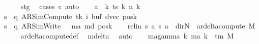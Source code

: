 \begin{isabellebody}
\ \ \ \ \isamarkupfalse%
\ stg\ \isamarkupfalse%
\ {\isacharparenleft}{\kern0pt}cases\ c{\isacharprime}{\kern0pt}{\isacharparenright}{\kern0pt}\ auto\isanewline
\ \ \isamarkupfalse%
\ {\isacharquery}{\kern0pt}a\ {\isacharequal}{\kern0pt}\ {\isachardoublequoteopen}{\isasymlambda}k{\isachardot}{\kern0pt}\ ts\ k\ {\isacharparenleft}{\kern0pt}n\ k{\isacharparenright}{\kern0pt}{\isachardoublequoteclose}\isanewline
\ \ \isamarkupfalse%
\ {\isacharquery}{\kern0pt}s\ {\isacharequal}{\kern0pt}\ {\isachardoublequoteopen}{\isacharparenleft}{\kern0pt}q{\isacharcomma}{\kern0pt}\ AR{\isacharunderscore}{\kern0pt}SimCompute{\isacharcomma}{\kern0pt}\ tk{\isacharcomma}{\kern0pt}\ i{\isacharcomma}{\kern0pt}\ buf{\isacharcomma}{\kern0pt}\ dvec{\isacharcomma}{\kern0pt}\ posk{\isacharparenright}{\kern0pt}{\isachardoublequoteclose}\isanewline
\ \ \isamarkupfalse%
\ {\isacharquery}{\kern0pt}s{\isacharprime}{\kern0pt}\ {\isacharequal}{\kern0pt}\ {\isachardoublequoteopen}{\isacharparenleft}{\kern0pt}q{\isacharprime}{\kern0pt}{\isacharcomma}{\kern0pt}\ AR{\isacharunderscore}{\kern0pt}SimWrite{\isacharcomma}{\kern0pt}\ {}{\isacharcomma}{\kern0pt}\ {}{\isacharcomma}{\kern0pt}\ m{\isacharunderscore}{\kern0pt}a{\isacharprime}{\kern0pt}{\isacharcomma}{\kern0pt}\ m{\isacharunderscore}{\kern0pt}d{\isacharcomma}{\kern0pt}\ posk{\isacharparenright}{\kern0pt}{\isachardoublequoteclose}\isanewline
\ \ \isamarkupfalse%
\ rel{\isacharunderscore}{\kern0pt}in{\isacharcolon}{\kern0pt}\ {\isachardoublequoteopen}{\isacharparenleft}{\kern0pt}{\isacharquery}{\kern0pt}s{\isacharcomma}{\kern0pt}\ {\isacharquery}{\kern0pt}a{\isacharcomma}{\kern0pt}\ {\isacharquery}{\kern0pt}s{\isacharprime}{\kern0pt}{\isacharcomma}{\kern0pt}\ {\isacharquery}{\kern0pt}a{\isacharcomma}{\kern0pt}\ {\isacharparenleft}{\kern0pt}{\isasymlambda}{\isacharunderscore}{\kern0pt}{\isachardot}{\kern0pt}\ dir{\isachardot}{\kern0pt}N{\isacharparenright}{\kern0pt}{\isacharparenright}{\kern0pt}\ {\isasymin}\ ar{\isacharunderscore}{\kern0pt}delta{\isacharunderscore}{\kern0pt}compute\ M{\isachardoublequoteclose}\isanewline
\ \ \ \ \isamarkupfalse%
\ ar{\isacharunderscore}{\kern0pt}delta{\isacharunderscore}{\kern0pt}compute{\isacharunderscore}{\kern0pt}def\ \isamarkupfalse%
\ mdelta\ \isamarkupfalse%
\ auto\isanewline
\ \ \isamarkupfalse%
\ ma{\isacharprime}{\kern0pt}{\isacharunderscore}{\kern0pt}gamma{\isacharcolon}{\kern0pt}\ {\isachardoublequoteopen}{\isasymforall}k{\isachardot}{\kern0pt}\ m{\isacharunderscore}{\kern0pt}a{\isacharprime}{\kern0pt}\ k\ {\isasymin}\ {\isasymGamma}{\isacharunderscore}{\kern0pt}tm\ M{\isachardoublequoteclose}\isanewline

\end{isabellebody}
